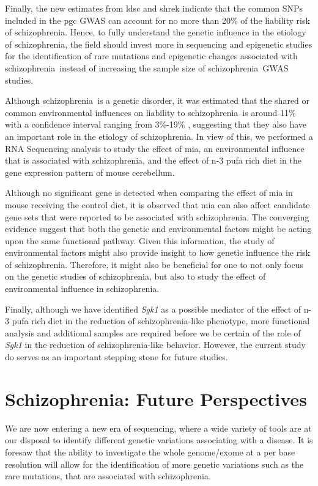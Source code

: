 \documentclass[12pt]{scrbook}
\newcommand*{\scz}{schizophrenia}
\begin{document}
Finally, the new estimates from \gls{ldsc} and \gls{shrek} indicate that the common \glspl{SNP} included in the \gls{pgc} \gls{GWAS} can account for no more than 20\% of the liability risk of \scz.
Hence, to fully understand the genetic influence in the etiology of \scz, the field should invest more in sequencing and epigenetic studies for the identification of rare mutations and epigenetic changes associated with \scz\ instead of increasing the sample size of \scz\ \gls{GWAS} studies. 

Although \scz\ is a genetic disorder, it was estimated that the shared or common environmental influences on liability to \scz\ is around 11\% with a confidence interval ranging from 3\%-19\%  \citep{Sullivan2003}, suggesting that they also have an important role in the etiology of \scz.
In view of this, we performed a RNA Sequencing analysis to study the effect of \gls{mia}, an environmental influence that is associated with \scz, and the effect of n-3 \gls{pufa} rich diet in the gene expression pattern of mouse cerebellum.

Although no significant gene is detected when comparing the effect of \gls{mia} in mouse receiving the control diet, it is observed that \gls{mia} can also affect candidate gene sets that were reported to be associated with \scz.
The converging evidence suggest that both the genetic and environmental factors might be acting upon the same functional pathway.
Given this information, the study of environmental factors might also provide insight to how genetic influence the risk of \scz. 
Therefore, it might also be beneficial for one to not only focus on the genetic studies of \scz, but also to study the effect of environmental influence in \scz.

Finally, although we have identified \textit{Sgk1} as a possible mediator of the effect of n-3 \gls{pufa} rich diet in the reduction of \scz-like phenotype, more functional analysis and additional samples are required before we be certain of the role of \textit{Sgk1} in the reduction of \scz-like behavior.
However, the current study do serves as an important stepping stone for future studies. 

\section{Schizophrenia: Future Perspectives}
We are now entering a new era of sequencing, where a wide variety of tools are at our disposal to identify different genetic variations associating with a disease. 
It is foresaw that the ability to investigate the whole genome/exome at a per base resolution will allow for the identification of more genetic variations such as the rare mutations, that are associated with \scz.
	
\end{document}
